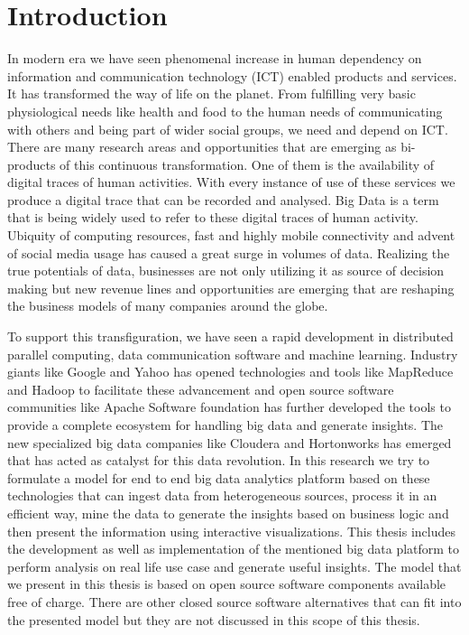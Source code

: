 \chapter{Introduction}
\label{chapter:intro}

 In modern era we have seen phenomenal increase in human dependency on information and communication technology (ICT) enabled products and services. It has transformed the way of life on the planet. From fulfilling very basic physiological needs like health and food to the human needs of communicating with others and being part of wider social groups, we need and depend on ICT. There are many research areas and opportunities that are emerging as bi-products of this continuous transformation. One of them is the availability of digital traces of human activities. With every instance of use of these services we produce a digital trace that can be recorded and analysed. Big Data is a term that is being widely used to refer to these digital traces of human activity. Ubiquity of computing resources, fast and highly mobile connectivity and advent of social media usage has caused a great surge in volumes of data. Realizing the true potentials of data, businesses are not only utilizing it as source of decision making but new revenue lines and opportunities are emerging that are reshaping the business models of many companies around the globe.
 
To support this transfiguration, we have seen a rapid development in distributed parallel computing, data communication software and machine learning. Industry giants like Google and Yahoo has opened technologies and tools like MapReduce and Hadoop to facilitate these advancement and open source software communities like Apache Software foundation has further developed the tools to provide a complete ecosystem for handling big data and generate insights. The new specialized big data companies like Cloudera and Hortonworks has emerged that has acted as catalyst for this data revolution. In this research we try to formulate a model for end to end big data analytics platform based on these technologies that can ingest data from heterogeneous sources, process it in an efficient way, mine the data to generate the insights based on business logic and then present the information using interactive visualizations. This thesis includes the development as well as implementation of the mentioned big data platform to perform analysis on real life use case and generate useful insights. The model that we present in this thesis is based on open source software components available free of charge. There are other closed source software alternatives that can fit into the presented model but they are not discussed in this scope of this thesis.

